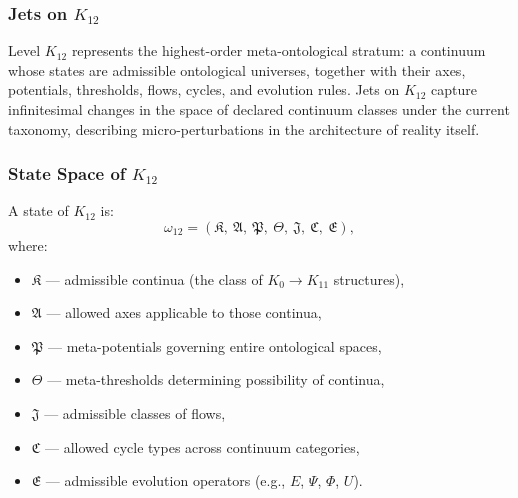 
\subsubsection{Jets on $K_{12}$}
\label{sec:jets-k12}

Level $K_{12}$ represents the highest-order meta-ontological stratum:
a continuum whose states are admissible ontological universes,
together with their axes, potentials, thresholds, flows, cycles, and
evolution rules. Jets on $K_{12}$ capture infinitesimal changes in the
space of declared continuum classes under the current taxonomy, describing micro-perturbations in the
architecture of reality itself.


\subsubsection{State Space of $K_{12}$}

A state of $K_{12}$ is:
\[
\omega_{12} =
(\mathfrak{K},\ \mathfrak{A},\ \mathfrak{P},\ \mathfrak{\Theta},\
 \mathfrak{J},\ \mathfrak{C},\ \mathfrak{E}),
\]
where:
\begin{itemize}
    \item $\mathfrak{K}$ — admissible continua (the class of $K_0\!\to\!K_{11}$ structures),
    \item $\mathfrak{A}$ — allowed axes applicable to those continua,
    \item $\mathfrak{P}$ — meta-potentials governing entire ontological spaces,
    \item $\mathfrak{\Theta}$ — meta-thresholds determining possibility of continua,
    \item $\mathfrak{J}$ — admissible classes of flows,
    \item $\mathfrak{C}$ — allowed cycle types across continuum categories,
    \item $\mathfrak{E}$ — admissible evolution operators (e.g., $E$, $\Psi$, $\Phi$, $U$).
\end{itemize}

